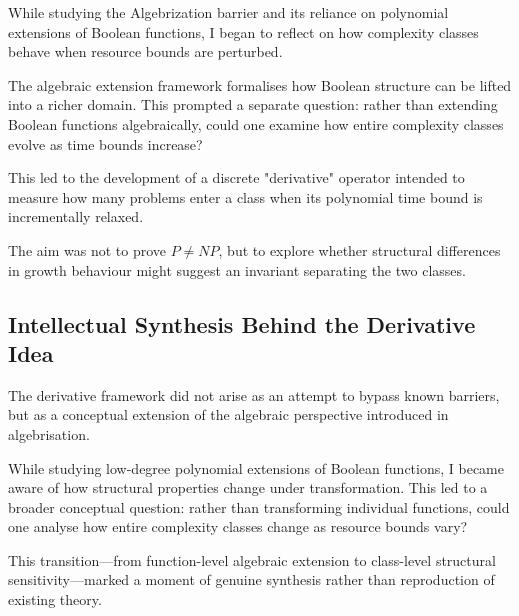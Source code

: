 \documentclass[12pt]{article}
\begin{document}
While studying the Algebrization barrier and its reliance on polynomial extensions of Boolean functions, I began to reflect on how complexity classes behave when resource bounds are perturbed. 

The algebraic extension framework formalises how Boolean structure can be lifted into a richer domain. 
This prompted a separate question: rather than extending Boolean functions algebraically, could one examine how entire complexity classes evolve as time bounds increase?

This led to the development of a discrete "derivative" operator intended to measure how many problems enter a class when its polynomial time bound is incrementally relaxed.

The aim was not to prove $P \neq NP$, but to explore whether structural differences in growth behaviour might suggest an invariant separating the two classes.

\subsection{Intellectual Synthesis Behind the Derivative Idea}

The derivative framework did not arise as an attempt to bypass known barriers, but as a conceptual extension of the algebraic perspective introduced in algebrisation.

While studying low-degree polynomial extensions of Boolean functions, I became aware of how structural properties change under transformation. This led to a broader conceptual question: rather than transforming individual functions, could one analyse how entire complexity classes change as resource bounds vary?

This transition---from function-level algebraic extension to class-level structural sensitivity---marked a moment of genuine synthesis rather than reproduction of existing theory.
\end{document}
